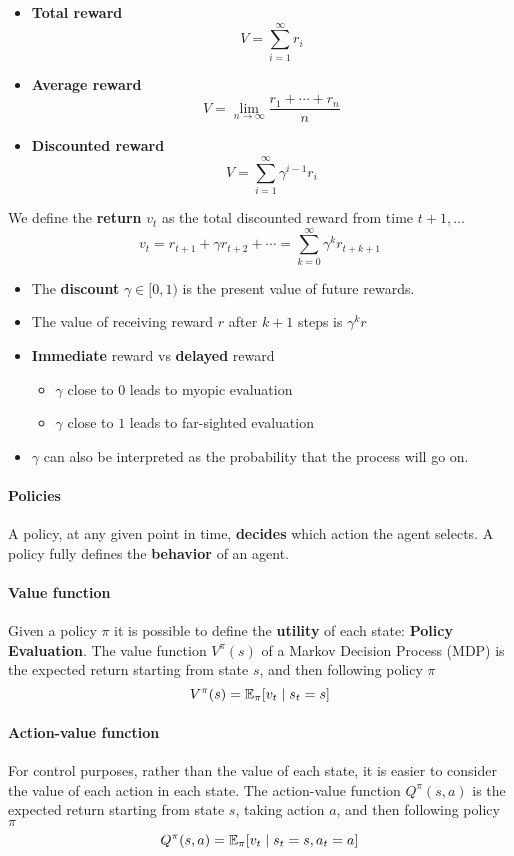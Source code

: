\begin{itemize}
    \item \textbf{Total reward}
    \[
        V = \sum_{i=1}^{\infty} r_i
    \]
    \item \textbf{Average reward}
    \[
        V = \lim_{n \to \infty} \frac{r_1 + \cdots + r_n}{n}
    \]
    \item \textbf{Discounted reward}
    \[
        V = \sum_{i=1}^{\infty} \gamma^{i-1} r_i
    \]
\end{itemize}

We define the \textbf{return} $v_t$ as the total discounted reward from time $t+1,\ldots$
\[
    v_t = r_{t+1} + \gamma r_{t+2} + \cdots = \sum_{k=0}^{\infty} \gamma^k r_{t+k+1}
\]
\begin{itemize}
    \item The \textbf{discount} $\gamma \in [0,1)$ is the present value of future rewards.
    \item The value of receiving reward $r$ after $k+1$ steps is $\gamma^k r $
    \item \textbf{Immediate} reward vs \textbf{delayed} reward
    \begin{itemize}
        \item $\gamma $ close to $0$ leads to myopic evaluation
        \item $\gamma $ close to $1$ leads to far-sighted evaluation
    \end{itemize}
    \item $\gamma $ can also be interpreted as the probability that the process will go on.
\end{itemize}

\paragraph{Policies}
A policy, at any given point in time, \textbf{decides} which action the agent selects. A policy fully defines the \textbf{behavior} of an agent.

\paragraph{Value function}
Given a policy $\pi$ it is possible to define the \textbf{utility} of each state: \textbf{Policy Evaluation}. The value function $V^{\pi}(s) $ of a Markov Decision Process (MDP) is the expected return starting from state $s$, and then following policy $\pi$
\[
    V^{\pi}(s) = \mathbb{E}_{\pi}[v_t\mid s_t=s]
\]
\paragraph{Action-value function}
For control purposes, rather than the value of each state, it is easier to consider the value of each action in each state. The action-value function $Q^{\pi}(s,a) $ is the expected return starting from state $s$, taking action $a$, and then following policy $\pi $
\[
    Q^{\pi}(s,a) = \mathbb{E}_{\pi}[v_t \mid s_t=s,a_t=a]
\]

